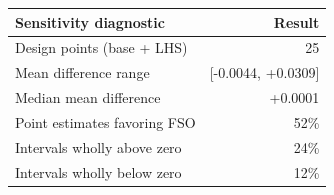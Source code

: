 \begin{tabular}{lr}
\toprule
Sensitivity diagnostic & Result \\
\midrule
Design points (base + LHS) & 25 \\
Mean difference range & [-0.0044, +0.0309] \\
Median mean difference & +0.0001 \\
Point estimates favoring FSO & 52\% \\
Intervals wholly above zero & 24\% \\
Intervals wholly below zero & 12\% \\
\bottomrule
\end{tabular}
